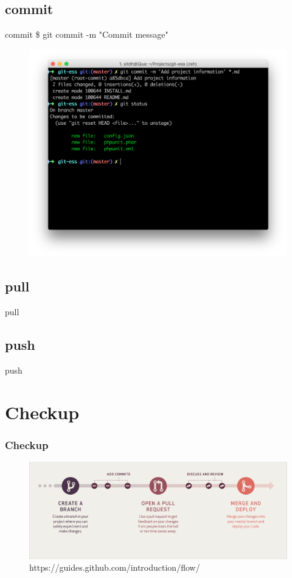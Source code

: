 \documentclass{beamer}
\begin{document}
\subsection{commit}
\begin{frame}{commit}
    \Large{\$ git commit -m "Commit message"}
    \begin{figure}
        \center
        \includegraphics[width=.9\textwidth]{commit-files}
        \label{fig:commit-files}
    \end{figure}
\end{frame}

\subsection{pull}
\begin{frame}{pull}
\end{frame}

\subsection{push}
\begin{frame}{push}
\end{frame}

\section{Checkup}
\begin{frame}
    \frametitle{Checkup}
    \begin{figure}
        \center
        \includegraphics[width=.9\textwidth]{git-workflow}
        \caption{https://guides.github.com/introduction/flow/}
        \label{fig:git-workflow}
    \end{figure}
\end{frame}
\end{document}
